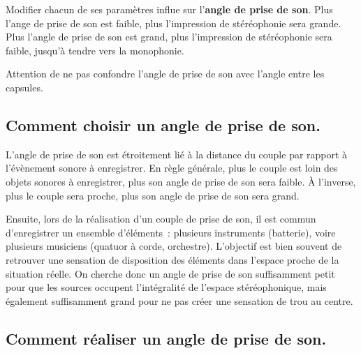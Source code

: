\documentclass[
  letterpaper,
  DIV=11,
  numbers=noendperiod]{scrreprt}
\begin{document}
Modifier chacun de ses paramètres influe sur l'\textbf{angle de prise de
son}. Plus l'ange de prise de son est faible, plus l'impression de
stéréophonie sera grande. Plus l'angle de prise de son est grand, plus
l'impression de stéréophonie sera faible, jusqu'à tendre vers la
monophonie.

\begin{tcolorbox}[enhanced jigsaw, leftrule=.75mm, arc=.35mm, bottomtitle=1mm, colback=white, colbacktitle=quarto-callout-caution-color!10!white, opacityback=0, left=2mm, rightrule=.15mm, opacitybacktitle=0.6, breakable, toptitle=1mm, titlerule=0mm, bottomrule=.15mm, toprule=.15mm, coltitle=black, title=\textcolor{quarto-callout-caution-color}{\faFire}\hspace{0.5em}{Mise en garde}]

Attention de ne pas confondre l'angle de prise de son avec l'angle entre
les capsules.

\end{tcolorbox}

\hypertarget{comment-choisir-un-angle-de-prise-de-son.}{%
\subsection{Comment choisir un angle de prise de
son.}\label{comment-choisir-un-angle-de-prise-de-son.}}

L'angle de prise de son est étroitement lié à la distance du couple par
rapport à l'évènement sonore à enregistrer. En règle générale, plus le
couple est loin des objets sonores à enregistrer, plus son angle de
prise de son sera faible. À l'inverse, plus le couple sera proche, plus
son angle de prise de son sera grand.

Ensuite, lors de la réalisation d'un couple de prise de son, il est
commun d'enregistrer un ensemble d'éléments~: plusieurs instruments
(batterie), voire plusieurs musiciens (quatuor à corde, orchestre).
L'objectif est bien souvent de retrouver une sensation de disposition
des éléments dans l'espace proche de la situation réelle. On cherche
donc un angle de prise de son suffisamment petit pour que les sources
occupent l'intégralité de l'espace stéréophonique, mais également
suffisamment grand pour ne pas créer une sensation de trou au centre.

\hypertarget{comment-ruxe9aliser-un-angle-de-prise-de-son.}{%
\subsection{Comment réaliser un angle de prise de
son.}\label{comment-ruxe9aliser-un-angle-de-prise-de-son.}}
\end{document}
